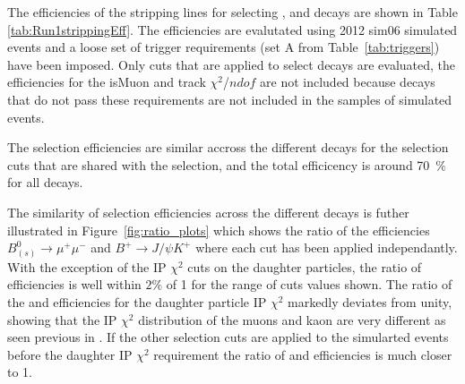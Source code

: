 The efficiencies of the stripping lines for selecting \bmumu, \bhh and \bujpsik decays are shown in Table \ref{tab:Run1strippingEff}. The efficiencies are evalutated using 2012 sim06 simulated events and a loose set of trigger requirements (set A from Table~\ref{tab:triggers}) have been imposed. Only cuts that are applied to select \bmumu decays are evaluated, the efficiencies for the isMuon and track $\chi^{2}$/$ndof$ are not included because decays that do not pass these requirements are not included in the samples of simulated events. 

The selection efficiencies are similar accross the different decays for the selection cuts that are shared with the \bmumu selection, and the total efficicency is around 70~$\%$ for all decays. 

The similarity of selection efficiencies across the different decays is futher illustrated in Figure~\ref{fig:ratio_plots} which shows the ratio of the efficiencies $B^{0}_{(s)}\to\mu^{+} \mu^{-}$ and $B^{+}\to J/\psi K^{+}$ where each cut has been applied independantly.  With the exception of the IP $\chi^{2}$ cuts on the daughter particles, the ratio of efficiencies is well within $2\%$ of 1 for the range of cuts values shown. The ratio of the \bsmumu and \bujpsik efficiencies for the daughter particle IP $\chi^{2}$ markedly deviates from unity, showing that the IP $\chi^{2}$ distribution of the muons and kaon are very different as seen previous in \cite{Diego}. If the other selection cuts are applied to the simularted events before the daughter IP $\chi^{2}$ requirement the ratio of \bmumu and \bujpsik efficiencies is much closer to 1. 


